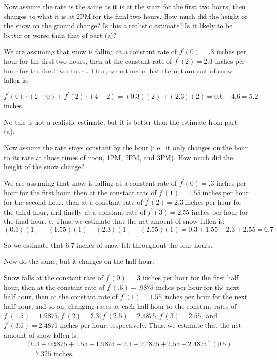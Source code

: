 \documentclass[handout, nooutcomes]{ximera}
\renewenvironment{freeResponse}{
\ifhandout\setbox0\vbox\bgroup\else
\begin{trivlist}\item[\hskip \labelsep\bfseries Solution:\hspace{2ex}]
\fi}
{\ifhandout\egroup\else
\end{trivlist}
\fi}
\begin{document}
\begin{problem}
\begin{enumerate}
  \item  Now assume the rate is the same as it is at the start for the first two hours, then changes to what it is at 2PM for the final two hours.  How much did the height of the snow on the ground change?  Is this a realistic estimate?  Is it likely to be better or worse than that of part (a)?
    \begin{freeResponse}
      We are assuming that snow is falling at a constant rate of $f^\prime (0)=.3$ inches per hour for the first two hours, then at the constant rate of $f^\prime (2)=2.3$ inches per hour for the final two hours.  Thus, we estimate that the net amount of snow fallen is:
      
      $f^\prime (0)\cdot (2-0)+ f^\prime (2) \cdot (4-2)= (0.3)(2) + (2.3)(2) = 0.6+4.6=5.2$ inches.
      
      No this is not a realistic estimate, but it is better than the estimate from part (a).  
    \end{freeResponse}
    
  \item  Now assume the rate stays constant by the hour (i.e., it only changes on the hour to its rate at those times of noon, 1PM, 2PM, and 3PM).  How much did the height of the snow change?
    \begin{freeResponse}
      We are assuming that snow is falling at a constant rate of $f^\prime (0)=.3$ inches per hour for the first hour, then at the constant rate of $f^\prime (1)=1.55$ inches per hour for the second hour, then at a constant rate of $f^\prime (2)=2.3$ inches per hour for the third hour, and finally at a constant rate of $f^\prime (3)=2.55$ inches per hour for the final hour.  c. Thus, we estimate that the net amount of snow fallen is:
      $$ (0.3)(1) + (1.55)(1) + (2.3)(1) + (2.55)(1) = 0.3 + 1.55 + 2.3 + 2.55 = 6.7 $$
      
      So we estimate that 6.7 inches of snow fell throughout the four hours.
    \end{freeResponse}
    
  \item  Now do the same, but it changes on the half-hour.
    \begin{freeResponse}
      Snow falls at the constant rate of $f^\prime (0)=.3$ inches per hour for the first half hour, then at the constant rate of $f^\prime (.5)=.9875$ inches per hour for the next half hour, then at the constant rate of $f^\prime (1)=1.55$ inches per hour for the next half hour, and so on, changing rates at each half hour to the constant rates of $f^\prime (1.5)=1.9875, f^\prime (2)=2.3, f^\prime (2.5)=2.4875, f^\prime (3)=2.55, $ and $f^\prime (3.5)=2.4875$ inches per hour, respectively.  Thus, we estimate that the net amount of snow fallen is:
      \begin{align*}
        & [0.3 + 0.9875 + 1.55 + 1.9875 + 2.3 + 2.4875 + 2.55 + 2.4875](0.5) \\
        &= 7.325 \text{ inches}.
      \end{align*}
    \end{freeResponse}
    

\end{enumerate}
\end{problem}
\end{document}
